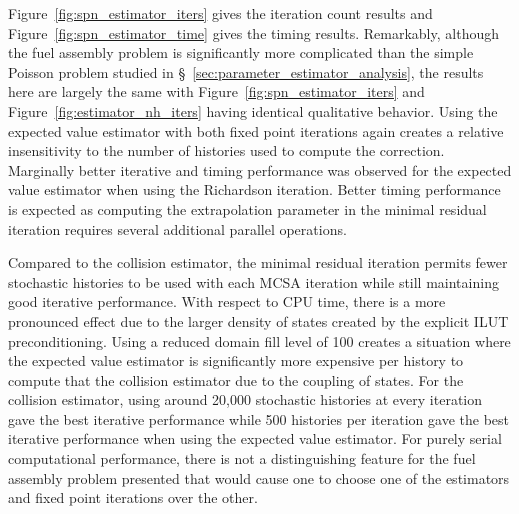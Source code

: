 Figure~\ref{fig:spn_estimator_iters} gives the iteration count results
and Figure~\ref{fig:spn_estimator_time} gives the timing
results. Remarkably, although the fuel assembly problem is
significantly more complicated than the simple Poisson problem studied
in \S~\ref{sec:parameter_estimator_analysis}, the results here are
largely the same with Figure~\ref{fig:spn_estimator_iters} and
Figure~\ref{fig:estimator_nh_iters} having identical qualitative
behavior. Using the expected value estimator with both fixed point
iterations again creates a relative insensitivity to the number of
histories used to compute the correction. Marginally better iterative
and timing performance was observed for the expected value estimator
when using the Richardson iteration. Better timing performance is
expected as computing the extrapolation parameter in the minimal
residual iteration requires several additional parallel
operations. 

Compared to the collision estimator, the minimal residual iteration
permits fewer stochastic histories to be used with each MCSA iteration
while still maintaining good iterative performance. With respect to
CPU time, there is a more pronounced effect due to the larger density
of states created by the explicit ILUT preconditioning. Using a
reduced domain fill level of 100 creates a situation where the
expected value estimator is significantly more expensive per history
to compute that the collision estimator due to the coupling of states.
For the collision estimator, using around 20,000 stochastic histories
at every iteration gave the best iterative performance while 500
histories per iteration gave the best iterative performance when using
the expected value estimator. For purely serial computational
performance, there is not a distinguishing feature for the fuel
assembly problem presented that would cause one to choose one of the
estimators and fixed point iterations over the other.

